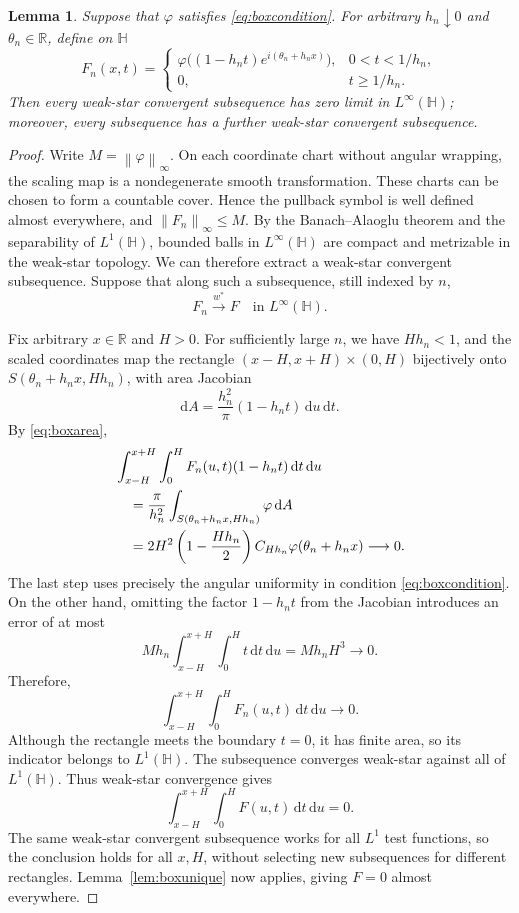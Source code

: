 \documentclass[12pt,a4paper]{article}
\newtheorem{lemma}[theorem]{Lemma}
\theoremstyle{remark}
\newcommand{\dd}{\,\mathrm d}
\newcommand{\dA}{\,\mathrm dA}
\newcommand{\norm}[1]{\left\lVert#1\right\rVert}
\begin{document}
\begin{lemma}\label{lem:boxblowup}
Suppose that $\varphi$ satisfies \eqref{eq:boxcondition}. For arbitrary $h_n\downarrow0$ and
$\theta_n\in\mathbb R$, define on $\mathbb H$
\begin{equation}\label{eq:scaledphi}
F_n(x,t)=
\begin{cases}
\varphi\bigl((1-h_nt)e^{i(\theta_n+h_nx)}\bigr),&0<t<1/h_n,\\
0,&t\ge1/h_n.
\end{cases}
\end{equation}
Then every weak-star convergent subsequence has zero limit in $L^\infty(\mathbb H)$;
moreover, every subsequence has a further weak-star convergent subsequence.
\end{lemma}
\begin{proof}
Write $M=\norm\varphi_\infty$. On each coordinate chart without angular wrapping, the scaling map is a nondegenerate smooth transformation.
These charts can be chosen to form a countable cover. Hence the pullback symbol is well defined almost everywhere, and
$\norm{F_n}_\infty\le M$.
By the Banach--Alaoglu theorem and the separability of $L^1(\mathbb H)$,
bounded balls in $L^\infty(\mathbb H)$ are compact and metrizable in the weak-star topology.
We can therefore extract a weak-star convergent subsequence.
Suppose that along such a subsequence, still indexed by $n$,
\[
F_n\overset{w^*}{\longrightarrow}F\quad\text{in }L^\infty(\mathbb H).
\]

Fix arbitrary $x\in\mathbb R$ and $H>0$. For sufficiently large $n$, we have $Hh_n<1$,
and the scaled coordinates map the rectangle $(x-H,x+H)\times(0,H)$ bijectively onto
$S(\theta_n+h_nx,Hh_n)$, with area Jacobian
\[
\mathrm dA=\frac{h_n^2}{\pi}(1-h_nt)\dd u\dd t.
\]
By \eqref{eq:boxarea},
\begin{align}
&\int_{x-H}^{x+H}\int_0^H F_n(u,t)(1-h_nt)\dd t\dd u\notag\\
&\quad=\frac\pi{h_n^2}\int_{S(\theta_n+h_nx,Hh_n)}\varphi\dA\notag\\
&\quad=2H^2\left(1-\frac{Hh_n}{2}\right)
 C_{Hh_n}\varphi(\theta_n+h_nx)\longrightarrow0.
\label{eq:scaledbox}
\end{align}
The last step uses precisely the angular uniformity in condition \eqref{eq:boxcondition}.
On the other hand, omitting the factor $1-h_nt$ from the Jacobian introduces an error of at most
\[
Mh_n\int_{x-H}^{x+H}\int_0^Ht\dd t\dd u=Mh_nH^3\longrightarrow0.
\]
Therefore,
\[
\int_{x-H}^{x+H}\int_0^HF_n(u,t)\dd t\dd u\longrightarrow0.
\]
Although the rectangle meets the boundary $t=0$, it has finite area, so its indicator belongs to $L^1(\mathbb H)$.
The subsequence converges weak-star against all of $L^1(\mathbb H)$.
Thus weak-star convergence gives
\[
\int_{x-H}^{x+H}\int_0^HF(u,t)\dd t\dd u=0.
\]
The same weak-star convergent subsequence works for all $L^1$ test functions, so the conclusion holds for all $x,H$,
without selecting new subsequences for different rectangles. Lemma~\ref{lem:boxunique} now applies, giving $F=0$ almost everywhere.
\end{proof}
\end{document}
